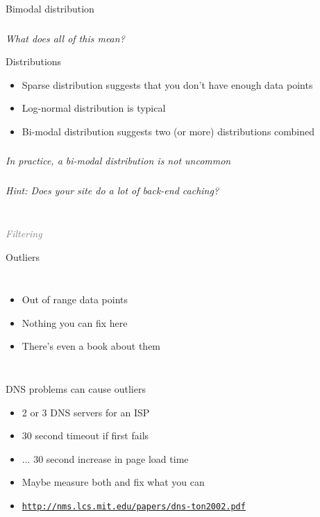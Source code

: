 \documentclass{beamer}
\newcommand{\innersplash}[1]{
  \begin{center}
    \Large \textrm{\textit{ #1 } }
  \end{center}
}
\newcommand{\splashslide}[2][{}]{
  \begin{frame}
  \frametitle{#1}
  \innersplash{#2}
  \end{frame}
}
\newcommand{\leadinslide}[2]{
  \splashslide{
     {\fontsize{150}{20}\selectfont{\raisebox{0pt}[90pt][0pt]{\textcolor{light-gray}{#1}}}} \\ \huge \textcolor{gray}{#2}
  }
}
\begin{document}
\begin{frame}{Bimodal distribution}
\end{frame}

\splashslide{What does all of this mean?}

\begin{frame}{Distributions}
\begin{itemize}
  \item Sparse distribution suggests that you don't have enough data points
  \item Log-normal distribution is typical
  \item Bi-modal distribution suggests two (or more) distributions combined
\end{itemize}
\end{frame}

\splashslide{In practice, a bi-modal distribution is not uncommon}

\splashslide{Hint: Does your site do a lot of back-end caching?}

\leadinslide{2-2}{Filtering}

\begin{frame}{Outliers}
  \begin{columns}[t]
  \begin{itemize}
  \item<2-> Out of range data points
  \item<3-> Nothing you can fix here
  \item<4-> There's even a book about them
  \end{itemize}
  \end{columns}
\end{frame}

\begin{frame}{DNS problems can cause outliers}
  \begin{itemize}
  \item 2 or 3 DNS servers for an ISP
  \item 30 second timeout if first fails
  \item ... 30 second increase in page load time
  \item Maybe measure both and fix what you can
  \item \href{http://nms.lcs.mit.edu/papers/dns-ton2002.pdf}{\scriptsize{\texttt{http://nms.lcs.mit.edu/papers/dns-ton2002.pdf}}}
  \end{itemize}
\end{frame}
\end{document}
